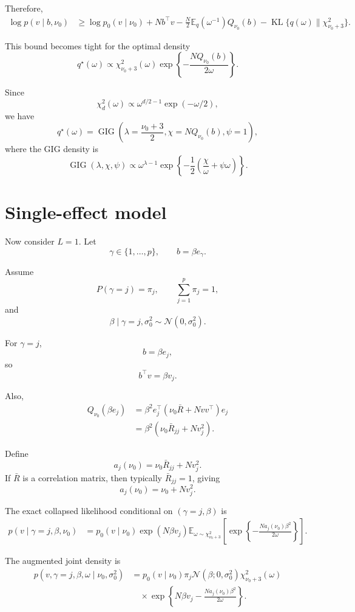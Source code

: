 \documentclass[11pt]{article}
\newcommand{\Rbar}{\bar R}
\newcommand{\nuo}{\nu_0}
\newcommand{\sigb}{\sigma_0^2}
\newcommand{\E}{\mathbb E}
\newcommand{\KL}{\operatorname{KL}}
\newcommand{\Normal}{\mathcal N}
\newcommand{\GIG}{\operatorname{GIG}}
\newcommand{\chisq}{\chi^2}
\begin{document}
Therefore,
\begin{align}
\log p(v\mid b,\nuo)
&\geq
\log p_0(v\mid \nuo)
+
Nb^\top v
-
\frac N2
\E_q(\omega^{-1})
Q_{\nuo}(b)
-
\KL\{q(\omega)\|\chisq_{\nuo+3}\}.
\label{eq:basic_elbo}
\end{align}

This bound becomes tight for the optimal density
\[
q^\star(\omega)
\propto
\chisq_{\nuo+3}(\omega)
\exp\left\{
-\frac{NQ_{\nuo}(b)}{2\omega}
\right\}.
\]

Since
\[
\chisq_d(\omega)
\propto
\omega^{d/2-1}\exp(-\omega/2),
\]
we have
\[
q^\star(\omega)
=
\GIG\left(
\lambda=\frac{\nuo+3}{2},
\chi=NQ_{\nuo}(b),
\psi=1
\right),
\]
where the GIG density is
\[
\GIG(\lambda,\chi,\psi)
\propto
\omega^{\lambda-1}
\exp\left\{
-\frac12
\left(
\frac{\chi}{\omega}+\psi\omega
\right)
\right\}.
\]

\section{Single-effect model}

Now consider \(L=1\). Let
\[
\gamma\in\{1,\dots,p\},
\qquad
b=\beta e_\gamma.
\]

Assume
\[
P(\gamma=j)=\pi_j,
\qquad
\sum_{j=1}^p \pi_j=1,
\]
and
\[
\beta\mid \gamma=j,\sigb \sim \Normal(0,\sigb).
\]

For \(\gamma=j\),
\[
b=\beta e_j,
\]
so
\[
b^\top v=\beta v_j.
\]

Also,
\begin{align}
Q_{\nuo}(\beta e_j)
&=
\beta^2 e_j^\top(\nuo\Rbar+Nvv^\top)e_j \\
&=
\beta^2
\left(
\nuo \Rbar_{jj}+Nv_j^2
\right).
\end{align}

Define
\[
a_j(\nuo)=\nuo\Rbar_{jj}+Nv_j^2.
\]
If \(\Rbar\) is a correlation matrix, then typically \(\Rbar_{jj}=1\), giving
\[
a_j(\nuo)=\nuo+Nv_j^2.
\]

The exact collapsed likelihood conditional on \((\gamma=j,\beta)\) is
\begin{align}
p(v\mid \gamma=j,\beta,\nuo)
&=
p_0(v\mid\nuo)
\exp(N\beta v_j)
\E_{\omega\sim\chisq_{\nuo+3}}
\left[
\exp\left\{
-\frac{N a_j(\nuo)\beta^2}{2\omega}
\right\}
\right].
\end{align}

The augmented joint density is
\begin{align}
p(v,\gamma=j,\beta,\omega\mid \nuo,\sigb)
&=
p_0(v\mid\nuo)
\pi_j
\Normal(\beta;0,\sigb)
\chisq_{\nuo+3}(\omega)
\nonumber\\
&\quad\times
\exp\left\{
N\beta v_j
-
\frac{N a_j(\nuo)\beta^2}{2\omega}
\right\}.
\label{eq:augmented_joint_L1}
\end{align}
\end{document}

